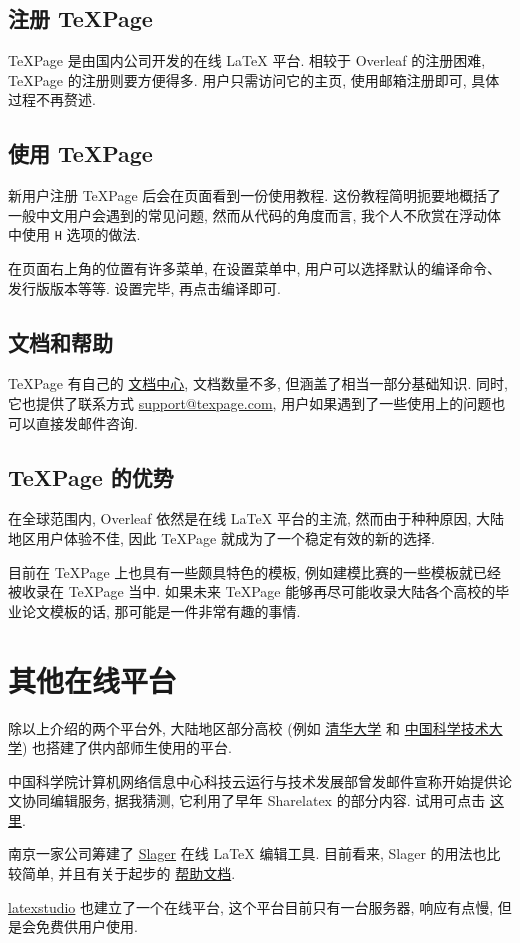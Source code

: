 \subsection{注册 TeXPage}

TeXPage 是由国内公司开发的在线 \LaTeX{} 平台.
相较于 Overleaf 的注册困难,
TeXPage 的注册则要方便得多.
用户只需访问它的主页,
使用邮箱注册即可,
具体过程不再赘述.

\subsection{使用 TeXPage}

新用户注册 TeXPage 后会在页面看到一份使用教程.
这份教程简明扼要地概括了一般中文用户会遇到的常见问题,
然而从代码的角度而言,
我个人不欣赏在浮动体中使用 \texttt{H} 选项的做法.

在页面右上角的位置有许多菜单,
在\textsf{设置}菜单中,
用户可以选择默认的编译命令、发行版版本等等.
设置完毕,
再点击编译即可.

\subsection{文档和帮助}

TeXPage 有自己的 \href{https://www.texpage.com/docs/}{文档中心},
文档数量不多,
但涵盖了相当一部分基础知识.
同时,
它也提供了联系方式 \href{mailto:support@texpage.com}%
{\ttfamily support@texpage.com},
用户如果遇到了一些使用上的问题也可以直接发邮件咨询.

\subsection{TeXPage 的优势}

在全球范围内,
Overleaf 依然是在线 \LaTeX{} 平台的主流,
然而由于种种原因,
大陆地区用户体验不佳,
因此 TeXPage 就成为了一个稳定有效的新的选择.

目前在 TeXPage 上也具有一些颇具特色的模板,
例如建模比赛的一些模板就已经被收录在 TeXPage 当中.
如果未来 TeXPage 能够再尽可能收录大陆各个高校的毕业论文模板的话,
那可能是一件非常有趣的事情.

\section{其他在线平台}

除以上介绍的两个平台外,
大陆地区部分高校 (例如%
\href{https://overleaf.tsinghua.edu.cn/login}{清华大学}%
和%
\href{https://latex.ustc.edu.cn/login}{中国科学技术大学}) 也搭建了供内部师生使用的平台.

中国科学院计算机网络信息中心科技云运行与技术发展部曾发邮件宣称开始提供论文协同编辑服务,
据我猜测,
它利用了早年 Sharelatex 的部分内容.
试用可点击%
\href{https://www.cstcloud.cn/resources/452}{这里}.

南京一家公司筹建了
\href{https://www.slager.link/#/Home}{Slager} 在线 \LaTeX{} 编辑工具.
目前看来,
Slager 的用法也比较简单,
并且有关于起步的%
\href{https://www.slager.link/#/HelpCenter}{帮助文档}.

\href{https://online.latexstudio.net/}{latexstudio} 也建立了一个在线平台,
这个平台目前只有一台服务器,
响应有点慢,
但是会免费供用户使用.
